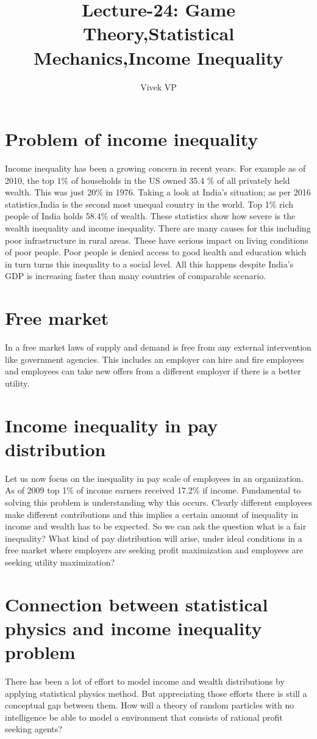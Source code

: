 \documentclass[letterpaper,english,12pt]{article}
\title{Lecture-24: Game Theory,Statistical Mechanics,Income Inequality}
\author{Vivek VP}
\begin{document}
\maketitle
\section{Problem of income inequality}
Income inequality has been a growing concern in recent years. For example as of 2010, the top 1\% of households in the US owned 35.4 \% of all privately held wealth. This was just 20\% in 1976. Taking a look at India's situation; as per 2016 statistics,India is the second most unequal country in the world. Top 1\% rich people of India holds 58.4\% of wealth. These statistics show how severe is the wealth inequality and income inequality. There are many causes for this including poor infrastructure in rural areas. These have serious impact on living conditions of poor people. Poor people is denied access to good health and education which in turn turns this inequality to a social level. All this happens despite India's GDP is increasing faster than many countries of comparable scenario.

\section{Free market}
In a free market laws of supply and demand is free from any external intervention like government agencies. This includes an employer can hire and fire employees and employees can take new offers from a different employer if there is a better utility. 

\section{Income inequality in pay distribution}
Let us now focus on  the inequality in pay scale of employees in an organization. As of 2009 top 1\% of income earners received 17.2\% if income. Fundamental to solving this problem is understanding why this occurs. Clearly different employees make different contributions and this implies a certain amount of  inequality in income and wealth has to be expected. So we can ask the question what is a fair inequality? What kind of pay distribution will arise, under ideal conditions in a free market where employers are seeking profit maximization and employees are seeking utility maximization?

\section{Connection between statistical physics and income inequality problem}
There has been a lot of effort to model income and wealth distributions by applying statistical physics method. But appreciating those efforts there is still a conceptual gap between them. How will a theory of random particles with no intelligence be able to model a environment that consists of rational profit seeking agents? 
\end{document}
